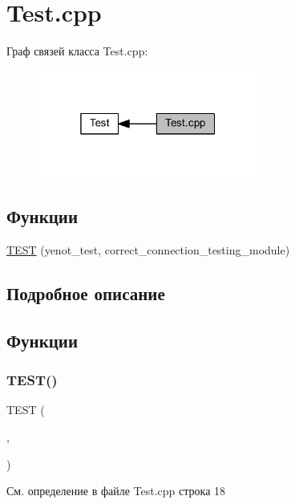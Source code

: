 \hypertarget{group__testcpp}{}\section{Test.\+cpp}
\label{group__testcpp}
Граф связей класса Test.\+cpp\+:
\nopagebreak
\begin{figure}[H]
\begin{center}
\leavevmode
\includegraphics[width=205pt]{group__testcpp}
\end{center}
\end{figure}
\subsection*{Функции}
\begin{DoxyCompactItemize}
\item 
\mbox{\hyperlink{group__testcpp_ga0c6e823009aa80ab758989270ff8eec2}{T\+E\+ST}} (yenot\+\_\+test, correct\+\_\+connection\+\_\+testing\+\_\+module)
\end{DoxyCompactItemize}


\subsection{Подробное описание}


\subsection{Функции}
\mbox{\label{group__testcpp_ga0c6e823009aa80ab758989270ff8eec2}} 
\subsubsection{\texorpdfstring{T\+E\+S\+T()}{TEST()}}
{\footnotesize\ttfamily T\+E\+ST (\begin{DoxyParamCaption}\item[{yenot\+\_\+test}]{,  }\item[{correct\+\_\+connection\+\_\+testing\+\_\+module}]{ }\end{DoxyParamCaption})}



См. определение в файле Test.\+cpp строка 18

